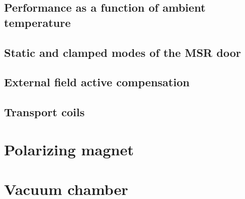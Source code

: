 

\subsection{Performance as a function of ambient temperature}




\subsection{Static and clamped modes of the MSR door}



\subsection{External field active compensation}



\subsection{Transport coils}



\section{Polarizing magnet}\label{sec:PM_description}



\section{Vacuum chamber}


